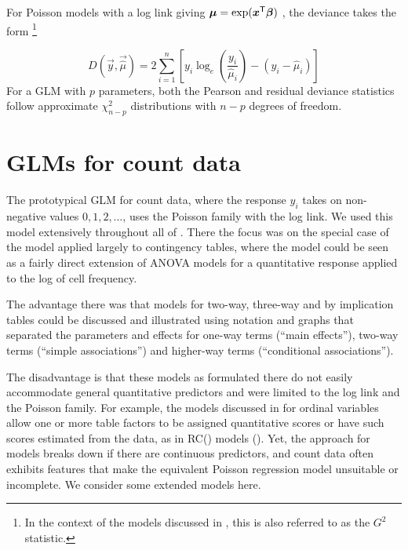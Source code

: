 \documentclass[11pt]{book}\usepackage[]{graphicx}\usepackage[]{color}
\begin{document}
For Poisson models with a log link giving $\bm{\mu} = \exp(\bm{x}^\mathsf{T} \bm{\beta})$ , the deviance takes the form%
\footnote{In the context of the \loglin models discussed in , this is also referred to
as the \LR $G^2$ statistic.}

\begin{equation}\label{eq:pois-deviance}
D (\vec{y}, \vec{\widehat{\mu}}) = 
  2 \sum_{i=1}^n \left[ y_i \log_e \left( \frac{y_i}{\widehat{\mu}_i} \right) - (y_i - \widehat{\mu}_i) \right]
\end{equation}
For a GLM with $p$ parameters, both the Pearson and residual deviance statistics follow
approximate $\chi^2_{n-p}$ distributions with $n-p$ degrees of freedom.

% 

\section{GLMs for count data}\label{sec:glm-count}


The prototypical GLM for count data, where the response $y_i$
takes on non-negative values $0, 1, 2, \dots$, 
uses the Poisson family with the log link.
We used this model extensively throughout all of .
There the focus was on the special case of the \loglin model
applied largely to contingency tables, where the \loglin model could
be seen as a fairly direct extension of ANOVA models for a 
quantitative response applied to the log of cell frequency.

The advantage there was that models for two-way, three-way and 
by implication \nway tables could be discussed and illustrated
using notation and graphs that separated the parameters and
effects for one-way terms (``main effects''), two-way terms
(``simple associations'') and higher-way terms (``conditional associations'').

The disadvantage is that these models as formulated there do not
easily accommodate general quantitative predictors and
were limited to the log link and the Poisson family.
For example, the models discussed in 
for ordinal variables allow one or more table factors to be
assigned quantitative scores or have such scores estimated from
the data, as in RC() models ().
Yet, the \ctab approach for \loglin models breaks down if there are
continuous predictors, and count data often exhibits features that
make the equivalent Poisson regression model unsuitable or incomplete.
We consider some extended models here.
\end{document}
